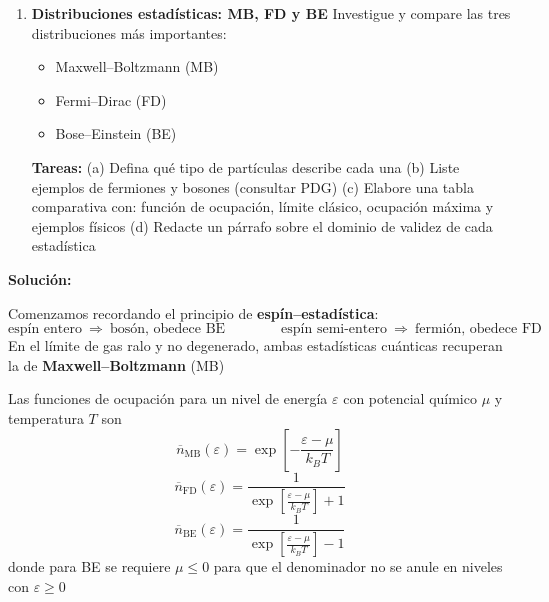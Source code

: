 \documentclass{article}
\newenvironment{AGbox}[1][7]%
{%
  \begin{tcolorbox}[
    enhanced, breakable,
    colframe=AppleGreen,
    colback=AppleGreen!#1,
    boxrule=1pt,
    borderline west={2mm}{-10mm}{AppleGreen},
    sharp corners=southwest,
    left=14pt,right=14pt,top=10pt,bottom=10pt,
     boxsep=6pt,
  ]%
}{%
  \end{tcolorbox}%
}
\begin{document}
\begin{AGbox}[8]
\begin{enumerate}[label={{\textcolor{trueblue}{\textbf{Pr.} \arabic*.7}}}, start=7]
  \item \textcolor{Cerulean}{\textbf{Distribuciones estadísticas: MB, FD y BE}}
  Investigue y compare las tres distribuciones más importantes:
  \begin{itemize}
    \item Maxwell–Boltzmann (MB)
    \item Fermi–Dirac (FD)
    \item Bose–Einstein (BE)
  \end{itemize}
  \textbf{Tareas:}
  (a) Defina qué tipo de partículas describe cada una
  (b) Liste ejemplos de fermiones y bosones (consultar PDG)
  (c) Elabore una tabla comparativa con: función de ocupación, límite clásico, ocupación máxima y ejemplos físicos
  (d) Redacte un párrafo sobre el dominio de validez de cada estadística
\end{enumerate}
\end{AGbox}

\vspace{0.5cm}
\textcolor{Cinnabar}{\textbf{Solución:}}

Comenzamos recordando el principio de \textcolor{Cerulean}{\textbf{espín–estadística}}:
\begin{equation}\label{eq:spin-stat}
\text{espín entero} \ \Rightarrow \ \text{bosón, obedece BE}
\qquad\qquad
\text{espín semi-entero} \ \Rightarrow \ \text{fermión, obedece FD}
\end{equation}
En el límite de gas ralo y no degenerado, ambas estadísticas cuánticas recuperan la de \textcolor{Cerulean}{\textbf{Maxwell–Boltzmann}} (MB)

Las funciones de ocupación para un nivel de energía $\varepsilon$ con potencial químico $\mu$ y temperatura $T$ son
\begin{equation}\label{eq:nMB}
\overline{n}_{\text{MB}}(\varepsilon)
=\exp\!\left[-\frac{\varepsilon-\mu}{k_B T}\right]
\end{equation}
\begin{equation}\label{eq:nFD}
\overline{n}_{\text{FD}}(\varepsilon)
=\frac{1}{\exp\!\left[\frac{\varepsilon-\mu}{k_B T}\right]+1}
\end{equation}
\begin{equation}\label{eq:nBE}
\overline{n}_{\text{BE}}(\varepsilon)
=\frac{1}{\exp\!\left[\frac{\varepsilon-\mu}{k_B T}\right]-1}
\end{equation}
donde para BE se requiere $\mu\le 0$ para que el denominador no se anule en niveles con $\varepsilon\ge 0$
\end{document}
